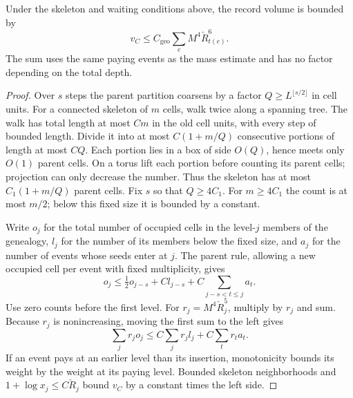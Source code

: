 \documentclass[11pt,letterpaper,reqno]{amsart}
\makeatletter
\numberwithin{equation}{section}
\theoremstyle{definition}
\newcommand{\ms@minorstart}{%
  \pushQED{\qed}\renewcommand{\qedsymbol}{$\blacksquare$}}
\newenvironment{lemma}[1][]{\ms@minorstart\ms@lemma[#1]}
  {\popQED\endms@lemma}
\theoremstyle{remark}
\makeatother
\begin{document}
\begin{lemma}[Own-scale charge of a standing genealogy]
\label{rt:lem-genealogy-charge}
Under the skeleton and waiting conditions above, the record
volume is bounded by
\begin{equation}\label{rt:eq-genealogy-charge}
        v_C\le C_{\mathrm{geo}}\sum_e M^4\check R_{t(e)}^6 .
\end{equation}
The sum uses the same paying events as the mass estimate
and has no factor depending on the total depth.
\end{lemma}
\begin{proof}
Over \(s\) steps the parent partition coarsens by a factor
\(Q\ge L^{\lfloor s/2\rfloor}\) in cell units. For a connected
skeleton of \(m\) cells, walk twice along a spanning tree.
The walk has total length at most \(C m\) in the old cell
units, with every step of bounded length. Divide it into at
most \(C(1+m/Q)\) consecutive portions of length at most
\(CQ\). Each portion lies in a box of side \(O(Q)\), hence
meets only \(O(1)\) parent cells. On a torus lift each portion
before counting its parent cells; projection can only
decrease the number. Thus the skeleton has at most
\(C_1(1+m/Q)\) parent cells. Fix \(s\) so that \(Q\ge4C_1\).
For \(m\ge4C_1\) the count is at most \(m/2\); below
this fixed size it is bounded by a constant.

Write \(o_j\) for the total number of occupied cells in
the level-\(j\) members of the genealogy, \(l_j\) for the
number of its members below the fixed size, and \(a_j\)
for the number of events whose seeds enter at \(j\). The parent rule,
allowing a new occupied cell per event with fixed multiplicity,
gives
\[
   o_j\le \tfrac12 o_{j-s}+C l_{j-s}
                      +C\sum_{j-s<t\le j}a_t .
\]
Use zero counts before the first level. For
\(r_j=M^4\check R_j^5\), multiply by \(r_j\) and sum.
Because \(r_j\) is nonincreasing, moving the first sum to the
left gives
\[
       \sum_j r_j o_j
          \le C\sum_j r_j l_j+C\sum_t r_t a_t .
\]
If an event pays at an earlier level than its insertion,
monotonicity bounds its weight by the weight at its paying
level. Bounded skeleton neighborhoods and
\(1+\log x_j\le C\check R_j\) bound \(v_C\) by a constant
times the left side.


\end{proof}
\end{document}

